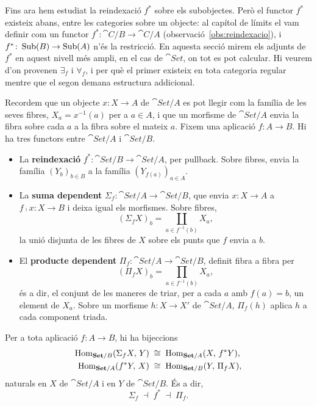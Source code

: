 Fins ara hem estudiat la reindexació $f^{*}$ sobre els subobjectes. Però el functor $f^{*}$ existeix abans, entre les categories sobre un objecte: al capítol de límits el vam definir com un functor $f^{*}\colon\cat{C}/B\to\cat{C}/A$ (observació~\ref{obs:reindexacio}), i $f^{*}\colon\operatorname{Sub}(B)\to\operatorname{Sub}(A)$ n'és la restricció. En aquesta secció mirem els adjunts de $f^{*}$ en aquest nivell més ampli, en el cas de $\cat{Set}$, on tot es pot calcular. Hi veurem d'on provenen $\exists_f$ i $\forall_f$, i per què el primer existeix en tota categoria regular mentre que el segon demana estructura addicional.

Recordem que un objecte $x\colon X\to A$ de $\cat{Set}/A$ es pot llegir com la família de les seves fibres, $X_a=x^{-1}(a)$ per a $a\in A$, i que un morfisme de $\cat{Set}/A$ envia la fibra sobre cada $a$ a la fibra sobre el mateix $a$. Fixem una aplicació $f\colon A\to B$. Hi ha tres functors entre $\cat{Set}/A$ i $\cat{Set}/B$.

\begin{itemize}
\item La \textbf{reindexació} $f^{*}\colon\cat{Set}/B\to\cat{Set}/A$, per pullback. Sobre fibres, envia la família $(Y_b)_{b\in B}$ a la família $(Y_{f(a)})_{a\in A}$.
\item La \textbf{suma dependent} $\Sigma_f\colon\cat{Set}/A\to\cat{Set}/B$, que envia $x\colon X\to A$ a $f\comp x\colon X\to B$ i deixa igual els morfismes. Sobre fibres,
\[
(\Sigma_f X)_b=\coprod_{a\in f^{-1}(b)}X_a,
\]
la unió disjunta de les fibres de $X$ sobre els punts que $f$ envia a $b$.
\item El \textbf{producte dependent} $\Pi_f\colon\cat{Set}/A\to\cat{Set}/B$, definit fibra a fibra per
\[
(\Pi_f X)_b=\prod_{a\in f^{-1}(b)}X_a,
\]
és a dir, el conjunt de les maneres de triar, per a cada $a$ amb $f(a)=b$, un element de $X_a$. Sobre un morfisme $h\colon X\to X'$ de $\cat{Set}/A$, $\Pi_f(h)$ aplica $h$ a cada component triada.
\end{itemize}

\begin{proposicio}\label{prop:sigma-pi-set}
Per a tota aplicació $f\colon A\to B$, hi ha bijeccions
\begin{align*}
\operatorname{Hom}_{\mathbf{Set}/B}(\Sigma_f X,\,Y)&\;\cong\;\operatorname{Hom}_{\mathbf{Set}/A}(X,\,f^{*}Y),\\
\operatorname{Hom}_{\mathbf{Set}/A}(f^{*}Y,\,X)&\;\cong\;\operatorname{Hom}_{\mathbf{Set}/B}(Y,\,\Pi_f X),
\end{align*}
naturals en $X$ de $\cat{Set}/A$ i en $Y$ de $\cat{Set}/B$. És a dir,
\[
\Sigma_f\;\dashv\;f^{*}\;\dashv\;\Pi_f.
\]
\end{proposicio}

